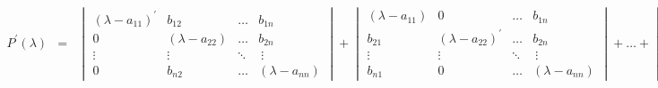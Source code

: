 \begin{eqnarray*}P^{'}(\lambda )& = & \begin{vmatrix} (\lambda -a_{11})^{'}&b_{12}&\ldots&b_{1n}\\
                                                     0&(\lambda -a_{22})& \ldots &b_{2n}\\
                                                      \vdots& \vdots&\ddots&\ \vdots\\
                                                         0 & b_{n2} & \ldots&(\lambda -a_{nn})
                                     \end{vmatrix} 
                                     +\begin{vmatrix} (\lambda -a_{11})&0&\ldots&b_{1n}\\
                                                        b_{21}&(\lambda -a_{22})^{'}&\ldots&b_{2n}\\
                                                       \vdots& \vdots&\ddots&\ \vdots\\
                                                       b_{n1}&0& \ldots&(\lambda-a_{nn})
                                      \end{vmatrix}
                                   +\ldots +\begin{vmatrix} (\lambda -a_{11})&b_{12}&\ ldots&0\\
                                                      b_{21} & ( \lambda -a_{22})&\ldots & 0\\
                                                       \vdots & \vdots & \ddots &\ \vdots \\
                                                       b_{n1}&b_{n2}& \ldots &(\lambda -a_{nn})^{'})
                                      \end{vmatrix}
                                       \end{eqnarray*}

